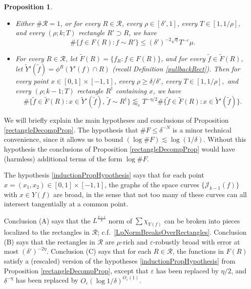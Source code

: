 \documentclass[letterpaper, reqno,11pt]{article}
\numberwithin{equation}{section}
\newcommand{\eps}{\varepsilon}
\numberwithin{thm}{section}
\newtheorem{prop}[thm]{Proposition}
\theoremstyle{remark}
\begin{document}
\begin{prop}
\begin{itemize}
%
\item[(B)]
Either $\#\mathcal{R}=1$, or for every $R\in\mathcal{R}$, every $\rho\in[\delta',1]$, every $T\in [1,1/\rho]$, and every $(\rho; k; T)$ rectangle $R'\supset R$, we have
\begin{equation}\label{conclusionB}
\#\{f\in F(R)\colon f\sim R'\} \leq (\delta')^{-2\sqrt\eta}T^{-\eps} \mu.
\end{equation}
%
\item[(C)]
For every $R\in\mathcal{R}$, let $\tilde F(R)=\{f_R\colon f\in F(R)\}$, and for every $\tilde f\in \tilde F(R)$, let $\tilde Y'(\tilde f)=\phi^R(Y'(f)\cap R)$ (recall Definition \ref{pullbackRect}). Then for every point $x\in[0,1]\times[-1,1]$, every $\rho\geq\delta/\delta'$, every $T\in[1,1/\rho],$ and every $(\rho; k-1; T)$ rectangle $R^\dag$ containing $x$, we have
\begin{equation}\label{inductionPropHypothesisAfterIteration}
\#\{\tilde f\in \tilde F(R)\colon x\in \tilde Y'(\tilde f),\  \tilde f\sim R^\dag\}\lessapprox_\eps  T^{-\eta/2} \#\{\tilde f\in \tilde F(R)\colon x\in \tilde Y'(\tilde f)\}. 
\end{equation}
\end{itemize}
\end{prop}

We will briefly explain the main hypotheses and conclusions of Proposition \ref{rectangleDecompProp}. The hypothesis that $\#F \leq \delta^{-N}$ is a minor technical convenience, since it allows us to bound $(\log \#F) \lesssim \log(1/\delta)$. Without this hypothesis the conclusions of Proposition \ref{rectangleDecompProp} would have (harmless) additional terms of the form $\log \#F$. 

The hypothesis \eqref{inductionPropHypothesis} says that for each point $x=(x_1,x_2)\in[0,1]\times[-1,1]$, the graphs of the space curves $\{\mathcal{J}_{k-1}(f)\}$ with $x\in Y(f)$ are broad, in the sense that not too many of these curves can all intersect tangentially at a common point. 

Conclusion (A) says that the $L^{\frac{k+1}{k}}$ norm of $\sum \chi_{Y(f)}$ can be broken into pieces localized to the rectangles in $\mathcal{R}$; c.f.~\eqref{LpNormBreaksOverRectangles}. Conclusion (B) says that the rectangles in $\mathcal{R}$ are $\mu$-rich and $\eps$-robustly broad with error at most $(\delta')^{-2\eta}$. Conclusion (C) says that for each $R\in\mathcal{R}$, the functions in $F(R)$ satisfy a (rescaled) version of the hypotheses \eqref{inductionPropHypothesis} from Proposition \ref{rectangleDecompProp}, except that $\eps$ has been replaced by $\eta/2$, and $\delta^{-\eta}$ has been replaced by $O_\eps(\log 1/\delta)^{O_\eps(1)}$. 
\end{document}
